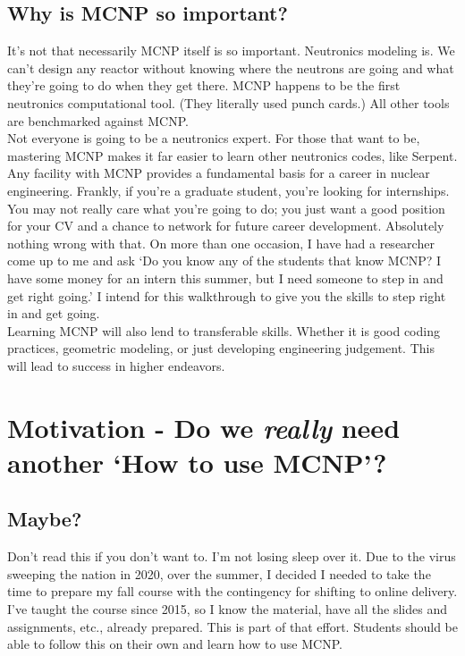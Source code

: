 \documentclass[11pt,a4paper]{article}
\begin{document}
\subsection{Why is MCNP so important?}
\noindent It's not that necessarily MCNP itself is so important. Neutronics modeling is. We can't design any reactor without knowing where the neutrons are going and what they're going to do when they get there. MCNP happens to be the first neutronics computational tool. (They literally used punch cards.) All other tools are benchmarked against MCNP.\\

\noindent Not everyone is going to be a neutronics expert. For those that want to be, mastering MCNP makes it far easier to learn other neutronics codes, like Serpent. Any facility with MCNP provides a fundamental basis for a career in nuclear engineering. Frankly, if you're a graduate student, you're looking for internships. You may not really care what you're going to do; you just want a good position for your CV and a chance to network for future career development. Absolutely nothing wrong with that. On more than one occasion, I have had a researcher come up to me and ask `Do you know any of the students that know MCNP? I have some money for an intern this summer, but I need someone to step in and get right going.' I intend for this walkthrough to give you the skills to step right in and get going.\\

\noindent Learning MCNP will also lend to transferable skills. Whether it is good coding practices, geometric modeling, or just developing engineering judgement. This will lead to success in higher endeavors. \\

\newpage


\section{Motivation - Do we \textit{really }need another `How to use MCNP'?} \label{motivation}
\subsection{Maybe?}
\noindent Don't read this if you don't want to. I'm not losing sleep over it. Due to the virus sweeping the nation in 2020, over the summer, I decided I needed to take the time to prepare my fall course with the contingency for shifting to online delivery. I've taught the course since 2015, so I know the material, have all the slides and assignments, etc., already prepared. This is part of that effort. Students should be able to follow this on their own and learn how to use MCNP. 
\end{document}
